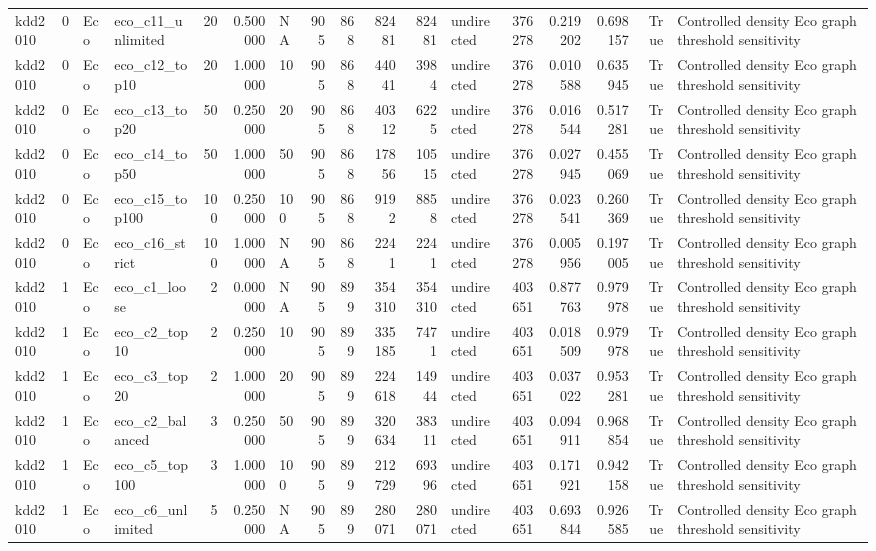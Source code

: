 \begin{tabular}{lrllrrlrrrrlrrrrl}
kdd2010 & 0 & Eco & eco_c11_unlimited & 20 & 0.500000 & NA & 905 & 868 & 82481 & 82481 & undirected & 376278 & 0.219202 & 0.698157 & True & Controlled density Eco graph threshold sensitivity \\
kdd2010 & 0 & Eco & eco_c12_top10 & 20 & 1.000000 & 10 & 905 & 868 & 44041 & 3984 & undirected & 376278 & 0.010588 & 0.635945 & True & Controlled density Eco graph threshold sensitivity \\
kdd2010 & 0 & Eco & eco_c13_top20 & 50 & 0.250000 & 20 & 905 & 868 & 40312 & 6225 & undirected & 376278 & 0.016544 & 0.517281 & True & Controlled density Eco graph threshold sensitivity \\
kdd2010 & 0 & Eco & eco_c14_top50 & 50 & 1.000000 & 50 & 905 & 868 & 17856 & 10515 & undirected & 376278 & 0.027945 & 0.455069 & True & Controlled density Eco graph threshold sensitivity \\
kdd2010 & 0 & Eco & eco_c15_top100 & 100 & 0.250000 & 100 & 905 & 868 & 9192 & 8858 & undirected & 376278 & 0.023541 & 0.260369 & True & Controlled density Eco graph threshold sensitivity \\
kdd2010 & 0 & Eco & eco_c16_strict & 100 & 1.000000 & NA & 905 & 868 & 2241 & 2241 & undirected & 376278 & 0.005956 & 0.197005 & True & Controlled density Eco graph threshold sensitivity \\
kdd2010 & 1 & Eco & eco_c1_loose & 2 & 0.000000 & NA & 905 & 899 & 354310 & 354310 & undirected & 403651 & 0.877763 & 0.979978 & True & Controlled density Eco graph threshold sensitivity \\
kdd2010 & 1 & Eco & eco_c2_top10 & 2 & 0.250000 & 10 & 905 & 899 & 335185 & 7471 & undirected & 403651 & 0.018509 & 0.979978 & True & Controlled density Eco graph threshold sensitivity \\
kdd2010 & 1 & Eco & eco_c3_top20 & 2 & 1.000000 & 20 & 905 & 899 & 224618 & 14944 & undirected & 403651 & 0.037022 & 0.953281 & True & Controlled density Eco graph threshold sensitivity \\
kdd2010 & 1 & Eco & eco_c2_balanced & 3 & 0.250000 & 50 & 905 & 899 & 320634 & 38311 & undirected & 403651 & 0.094911 & 0.968854 & True & Controlled density Eco graph threshold sensitivity \\
kdd2010 & 1 & Eco & eco_c5_top100 & 3 & 1.000000 & 100 & 905 & 899 & 212729 & 69396 & undirected & 403651 & 0.171921 & 0.942158 & True & Controlled density Eco graph threshold sensitivity \\
kdd2010 & 1 & Eco & eco_c6_unlimited & 5 & 0.250000 & NA & 905 & 899 & 280071 & 280071 & undirected & 403651 & 0.693844 & 0.926585 & True & Controlled density Eco graph threshold sensitivity \\

\end{tabular}
